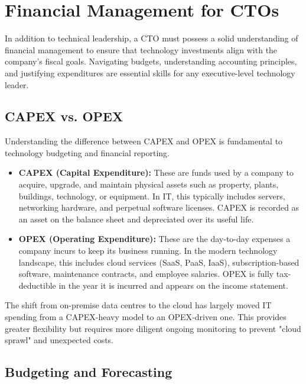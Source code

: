 \section{Financial Management for CTOs}
\label{sec:financial-management}

In addition to technical leadership, a \gls{CTO} must possess a solid understanding of financial management to ensure that technology investments align with the company's fiscal goals. Navigating budgets, understanding accounting principles, and justifying expenditures are essential skills for any executive-level technology leader.

\subsection{\gls{CAPEX} vs. \gls{OPEX}}

Understanding the difference between \gls{CAPEX} and \gls{OPEX} is fundamental to technology budgeting and financial reporting.

\begin{itemize}
    \item \textbf{\gls{CAPEX} (Capital Expenditure):} These are funds used by a company to acquire, upgrade, and maintain physical assets such as property, plants, buildings, technology, or equipment. In IT, this typically includes servers, networking hardware, and perpetual software licenses. \gls{CAPEX} is recorded as an asset on the balance sheet and depreciated over its useful life.
    \item \textbf{\gls{OPEX} (Operating Expenditure):} These are the day-to-day expenses a company incurs to keep its business running. In the modern technology landscape, this includes cloud services (\gls{SaaS}, PaaS, IaaS), subscription-based software, maintenance contracts, and employee salaries. \gls{OPEX} is fully tax-deductible in the year it is incurred and appears on the income statement.
\end{itemize}

The shift from on-premise data centres to the cloud has largely moved IT spending from a \gls{CAPEX}-heavy model to an \gls{OPEX}-driven one. This provides greater flexibility but requires more diligent ongoing monitoring to prevent "cloud sprawl" and unexpected costs.

\subsection{Budgeting and Forecasting}

